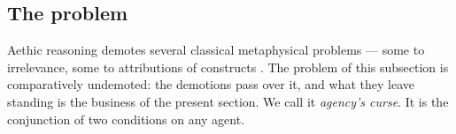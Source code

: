 \documentclass[11pt]{article}
\numberwithin{equation}{section}
\theoremstyle{plain}
\theoremstyle{definition}
\theoremstyle{remark}
\begin{document}
%

\subsection{The problem}\label{ac:sub:problem}

Aethic reasoning demotes several classical metaphysical problems --- some to irrelevance, some to attributions of constructs \cite{Aethus}. The problem of this subsection is comparatively undemoted: the demotions pass over it, and what they leave standing is the business of the present section. We call it \emph{agency's curse}. It is the conjunction of two conditions on any agent.
\end{document}
